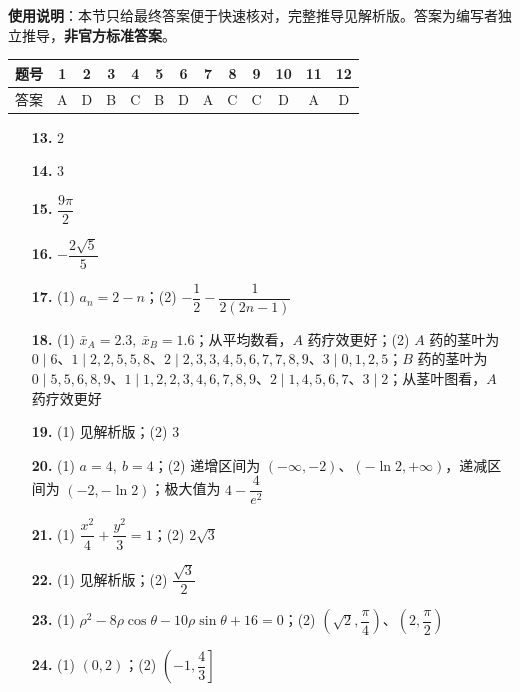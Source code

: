 
\begin{gknotice}
\textbf{使用说明}：本节只给最终答案便于快速核对，完整推导见解析版。答案为编写者独立推导，\textbf{非官方标准答案}。
\end{gknotice}

\begin{center}\begin{tabular}{ccccccccccccc}
\toprule
题号 & 1 & 2 & 3 & 4 & 5 & 6 & 7 & 8 & 9 & 10 & 11 & 12 \\
\midrule
答案 & A & D & B & C & B & D & A & C & C & D & A & D \\
\bottomrule
\end{tabular}\end{center}

\begin{itemize}[leftmargin=2.6em]
  \item[\textbf{13.}] $2$
  \item[\textbf{14.}] $3$
  \item[\textbf{15.}] $\dfrac{9\pi}{2}$
  \item[\textbf{16.}] $-\dfrac{2\sqrt5}{5}$
\end{itemize}

\begin{itemize}[leftmargin=2.6em]
  \item[\textbf{17.}] (1) $a_n=2-n$；(2) $-\dfrac12-\dfrac{1}{2(2n-1)}$
  \item[\textbf{18.}] (1) $\bar x_A=2.3,\ \bar x_B=1.6$；从平均数看，$A$ 药疗效更好；(2) $A$ 药的茎叶为 $0\mid6$、$1\mid2,2,5,5,8$、$2\mid2,3,3,4,5,6,7,7,8,9$、$3\mid0,1,2,5$；$B$ 药的茎叶为 $0\mid5,5,6,8,9$、$1\mid1,2,2,3,4,6,7,8,9$、$2\mid1,4,5,6,7$、$3\mid2$；从茎叶图看，$A$ 药疗效更好
  \item[\textbf{19.}] (1) 见解析版；(2) $3$
  \item[\textbf{20.}] (1) $a=4,\ b=4$；(2) 递增区间为 $(-\infty,-2)$、$(-\ln2,+\infty)$，递减区间为 $(-2,-\ln2)$；极大值为 $4-\dfrac4{e^2}$
  \item[\textbf{21.}] (1) $\dfrac{x^2}{4}+\dfrac{y^2}{3}=1$；(2) $2\sqrt3$
  \item[\textbf{22.}] (1) 见解析版；(2) $\dfrac{\sqrt3}{2}$
  \item[\textbf{23.}] (1) $\rho^2-8\rho\cos\theta-10\rho\sin\theta+16=0$；(2) $\left(\sqrt2,\dfrac\pi4\right)$、$\left(2,\dfrac\pi2\right)$
  \item[\textbf{24.}] (1) $(0,2)$；(2) $\left(-1,\dfrac43\right]$
\end{itemize}
